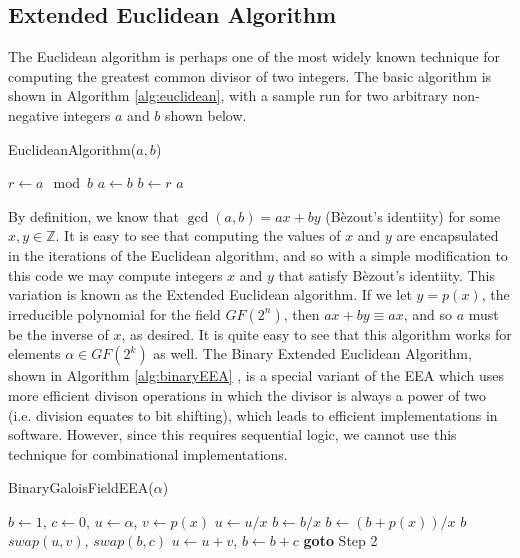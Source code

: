 
\subsection{Extended Euclidean Algorithm}
The Euclidean algorithm is perhaps one of the most widely known technique for computing
the greatest common divisor of two integers. The basic algorithm is shown in Algorithm \ref{alg:euclidean},
with a sample run for two arbitrary non-negative integers $a$ and $b$ shown below.

\begin{algorithm}[ht!] %
\caption{EuclideanAlgorithm($a, b$)} \label{alg:euclidean}
\begin{algorithmic}[1]
		\State $r \gets a \mod b$
		\State $a \gets b$
		\State $b \gets r$
	\EndWhile
	\State \Return $a$
\end{algorithmic}
\end{algorithm}

By definition, we know that $\gcd(a, b) = ax + by$ (B\`{e}zout's identiity) for some $x,y \in \mathbb{Z}$. 
It is easy to see that computing the values of $x$ and $y$ are encapsulated in the iterations
of the Euclidean algorithm, and so with a simple modification to this code we may compute integers $x$ and
$y$ that satisfy B\`{e}zout's identiity. This variation is known as the Extended Euclidean algorithm.
If we let $y = p(x)$, the irreducible polynomial for the field $GF(2^n)$, then 
$ax + by \equiv ax$, and so $a$ must be the inverse of $x$,
as desired. It is quite easy to see that this algorithm works for elements $\alpha \in GF(2^k)$ as well.
The Binary Extended Euclidean Algorithm, shown in Algorithm \ref{alg:binaryEEA} \cite{Guajardo06-1}, 
is a special variant of the EEA which uses more efficient divison operations in which the divisor 
is always a power of two (i.e. division equates to bit shifting), which leads to efficient implementations 
in software. However, since this requires sequential logic, we cannot use this technique
for combinational implementations.

\begin{algorithm}[ht!] %
\caption{BinaryGaloisFieldEEA($\alpha$)} \label{alg:binaryEEA}
\begin{algorithmic}[1]
	\State $b \gets 1$, $c \gets 0$, $u \gets \alpha$, $v \gets p(x)$
		\State $u \gets u/x$
			\State $b \gets b/x$
		\Else
			\State $b \gets (b + p(x)) / x$
		\EndIf
	\EndWhile
		\State \Return $b$
	\EndIf
		\State $swap(u, v)$, $swap(b, c)$
	\EndIf
	\State $u \gets u + v$, $b \gets b + c$
	\State \textbf{goto} Step 2
\end{algorithmic}
\end{algorithm}

